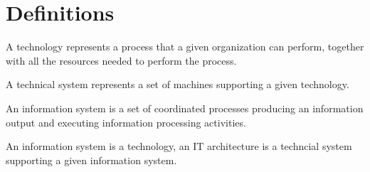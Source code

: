 \section{Definitions}

\begin{definition}
    A technology represents a process that a given organization can perform, together with all the resources needed to perform the process. 
\end{definition}
\begin{definition}
    A technical system represents a set of machines supporting a given technology.
\end{definition}
\begin{definition}
    An information system is a set of coordinated processes producing an information output and executing information processing activities. 
\end{definition}
\begin{definition}
    An information system is a technology, an IT architecture is a techncial system supporting a given information system.
\end{definition}

